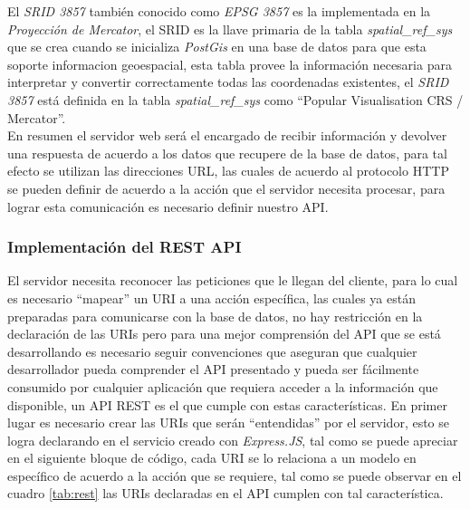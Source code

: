 El \emph{SRID 3857} también conocido como \emph{EPSG 3857} es la implementada en la \emph{Proyección de Mercator}, el SRID  es la llave primaria de la tabla \emph{spatial\_ref\_sys} que se crea cuando se inicializa \emph{PostGis} en una base de datos para que esta soporte informacion geoespacial, esta tabla provee la información necesaria para interpretar y convertir correctamente todas las coordenadas existentes, el \emph{SRID 3857} está definida en la tabla \emph{spatial\_ref\_sys} como ``Popular Visualisation CRS / Mercator''.\\

En resumen el servidor web será el encargado de recibir información y devolver una respuesta de acuerdo a los datos que recupere de la base de datos, para tal efecto se utilizan las direcciones URL, las cuales de acuerdo al protocolo HTTP se pueden definir de acuerdo a la acción que el servidor necesita procesar, para lograr esta comunicación es necesario definir nuestro API.\\




\subsubsection{Implementación del REST API}
\label{subs:Implementacion del REST API}



El servidor necesita reconocer las peticiones que le llegan del cliente, para lo cual es necesario ``mapear'' un URI a una acción específica, las cuales ya están preparadas para comunicarse con la base de datos, no hay restricción en la declaración de las URIs pero para una mejor comprensión del API que se está desarrollando es necesario seguir convenciones que aseguran que cualquier desarrollador pueda comprender el API presentado y pueda ser fácilmente consumido por cualquier aplicación que requiera acceder a la información que disponible, un API REST es el que cumple con estas características.
En primer lugar es necesario crear las URIs que serán ``entendidas'' por el servidor, esto se logra declarando en el servicio creado con \emph{Express.JS}, tal como se puede apreciar en el siguiente bloque de código, cada URI se lo relaciona a un modelo en específico de acuerdo a la acción que se requiere, tal como se puede observar en el cuadro \ref{tab:rest} las URIs declaradas en el API cumplen con tal característica.\\


